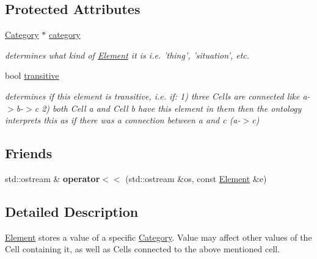 \subsection*{\-Protected \-Attributes}
\begin{DoxyCompactItemize}
\item 
\hypertarget{class_element_afa00dd000a5070957ea6d6035fb966bb}{\hyperlink{class_category}{\-Category} $\ast$ \hyperlink{class_element_afa00dd000a5070957ea6d6035fb966bb}{category}}\label{class_element_afa00dd000a5070957ea6d6035fb966bb}

\begin{DoxyCompactList}\small\item\em determines what kind of \hyperlink{class_element}{\-Element} it is i.\-e. 'thing', 'situation', etc. \end{DoxyCompactList}\item 
bool \hyperlink{class_element_aab52339b96c0a9ed05da28a26b5fb146}{transitive}
\begin{DoxyCompactList}\small\item\em determines if this element is transitive, i.\-e. if\-: 1) three \-Cells are connected like a-\/$>$b-\/$>$c 2) both \-Cell a and \-Cell b have this element in them then the ontology interprets this as if there was a connection between a and c (a-\/$>$c) \end{DoxyCompactList}\end{DoxyCompactItemize}
\subsection*{\-Friends}
\begin{DoxyCompactItemize}
\item 
\hypertarget{class_element_a67d1cdc1dbbd62556631b0551f18642c}{std\-::ostream \& {\bfseries operator$<$$<$} (std\-::ostream \&os, const \hyperlink{class_element}{\-Element} \&e)}\label{class_element_a67d1cdc1dbbd62556631b0551f18642c}

\end{DoxyCompactItemize}


\subsection{\-Detailed \-Description}
\hyperlink{class_element}{\-Element} stores a value of a specific \hyperlink{class_category}{\-Category}. \-Value may affect other values of the \-Cell containing it, as well as \-Cells connected to the above mentioned cell. 

